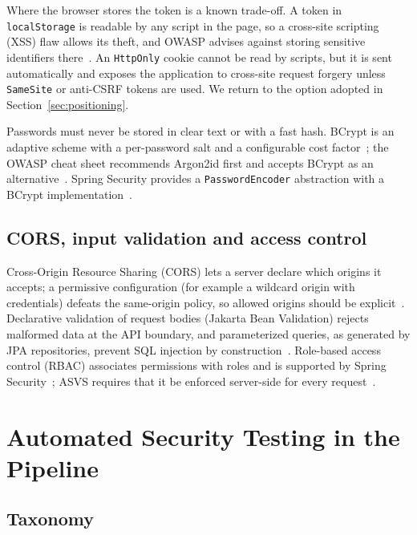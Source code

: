 Where the browser stores the token is a known trade-off. A token in \texttt{localStorage} is readable by any script in the page, so a cross-site scripting (XSS) flaw allows its theft, and OWASP advises against storing sensitive identifiers there~\cite{owasp-html5-cheatsheet}. An \texttt{HttpOnly} cookie cannot be read by scripts, but it is sent automatically and exposes the application to cross-site request forgery unless \texttt{SameSite} or anti-CSRF tokens are used. We return to the option adopted in Section~\ref{sec:positioning}.

Passwords must never be stored in clear text or with a fast hash. BCrypt is an adaptive scheme with a per-password salt and a configurable cost factor~\cite{provos1999}; the OWASP cheat sheet recommends Argon2id first and accepts BCrypt as an alternative~\cite{owasp-password-cheatsheet}. Spring Security provides a \texttt{PasswordEncoder} abstraction with a BCrypt implementation~\cite{spring-security}.

\subsection{CORS, input validation and access control}

Cross-Origin Resource Sharing (CORS) lets a server declare which origins it accepts; a permissive configuration (for example a wildcard origin with credentials) defeats the same-origin policy, so allowed origins should be explicit~\cite{spring-security}. Declarative validation of request bodies (Jakarta Bean Validation) rejects malformed data at the API boundary, and parameterized queries, as generated by JPA repositories, prevent SQL injection by construction~\cite{owasp-top10}. Role-based access control (RBAC) associates permissions with roles and is supported by Spring Security~\cite{spring-security}; ASVS requires that it be enforced server-side for every request~\cite{owasp-asvs}.

\section{Automated Security Testing in the Pipeline}
\label{sec:testing}

\subsection{Taxonomy}

